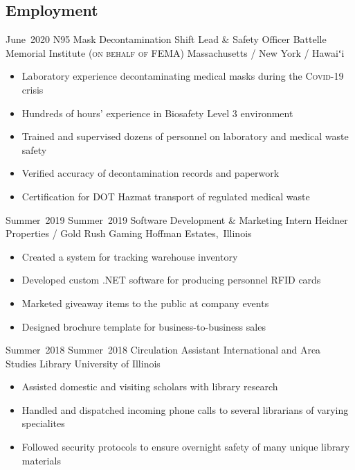 \subsection*{Employment}
\secitemexperience
	{June~2020}
	{}
	{N95 Mask Decontamination Shift Lead \& Safety Officer}
	{Battelle Memorial Institute {\scshape\footnotesize (on behalf of FEMA)}}
	{Massachusetts / New York / Hawaiʻi}
	{
		\begin{itemize}
			\vspace{-2mm}
			\item Laboratory experience decontaminating medical masks during the {\scshape Covid-19} crisis
			\item Hundreds of hours' experience in Biosafety Level 3 environment
			\item Trained and supervised dozens of personnel on laboratory and medical waste safety
			\item Verified accuracy of decontamination records and paperwork
			\item Certification for DOT Hazmat transport of regulated medical waste
			\vspace{-2mm}
		\end{itemize}
	}
\secitemexperience
	{Summer~2019}
	{Summer~2019}
	{Software Development \& Marketing Intern}
	{Heidner Properties / Gold Rush Gaming}
	{Hoffman Estates,~Illinois}
	{
		\begin{itemize}
			\vspace{-2mm}
			\item Created a system for tracking warehouse inventory
			\item Developed custom .NET software for producing personnel RFID cards
			\item Marketed giveaway items to the public at company events
			\item Designed brochure template for business-to-business sales
			\vspace{-2mm}
		\end{itemize}
	}
\secitemexperience
	{Summer~2018}
	{Summer~2018}
	{Circulation Assistant}
	{International and Area Studies Library}
	{University of Illinois}
	{
		\begin{itemize}
			\vspace{-2mm}
			\item Assisted domestic and visiting scholars with library research
			\item Handled and dispatched incoming phone calls to several librarians of varying specialites
			\item Followed security protocols to ensure overnight safety of many unique library materials 
			\vspace{-2mm}
		\end{itemize}
	}
